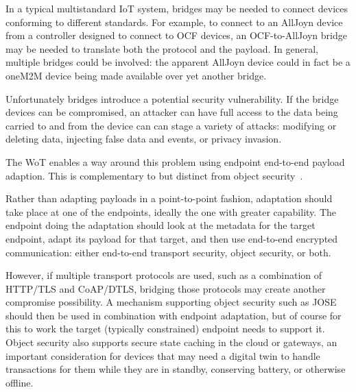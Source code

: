 In a typical multistandard IoT system,
bridges may be needed to connect devices
conforming to different standards.
For example,
to connect to an AllJoyn device from a controller
designed to connect to OCF devices, an OCF-to-AllJoyn bridge
may be needed to translate both the protocol and the payload.
In general, multiple bridges could be involved: the
apparent AllJoyn device could in fact be a oneM2M device
being made available over yet another bridge.

Unfortunately bridges introduce a potential security vulnerability.
If the bridge devices can be compromised,
an attacker can have full access to the
data being carried to and from the device can can stage a 
variety of attacks: 
modifying or deleting data,
injecting false data and events,
or privacy invasion.

The WoT enables a way around this problem using endpoint 
end-to-end payload adaption.
This is complementary to but distinct from object security~\cite{Mattsson2014}.

Rather than adapting payloads in a point-to-point fashion,
adaptation should take place at one of the endpoints, ideally the
one with greater capability.  The endpoint doing the adaptation should
look at the metadata for the target endpoint, adapt its payload for that
target, and then use end-to-end encrypted communication:
either end-to-end transport security, object security, or both.

However, if multiple transport protocols are used, such as a 
combination of HTTP/TLS and CoAP/DTLS, bridging those protocols
may create another compromise possibility.  A mechanism supporting
object security such as JOSE~\cite{Jose2017} should then be used
in combination with endpoint adaptation, but of course for this to
work the target (typically constrained) endpoint needs to support it. 
Object security also supports secure state caching in the cloud or gateways,
an important consideration for devices that may need a digital
twin to handle transactions for them while they are in standby,
conserving battery, or otherwise offline.

